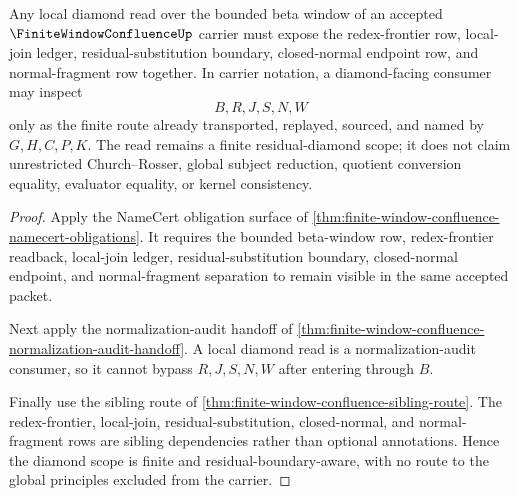 \begin{theorem}
\label{thm:finite-window-confluence-residual-diamond-scope}
Any local diamond read over the bounded beta window of an accepted $\FiniteWindowConfluenceUp$ carrier must expose the redex-frontier row, local-join ledger, residual-substitution boundary, closed-normal endpoint row, and normal-fragment row together. In carrier notation, a diamond-facing consumer may inspect
$$
B,R,J,S,N,W
$$
only as the finite route already transported, replayed, sourced, and named by $G,H,C,P,K$. The read remains a finite residual-diamond scope; it does not claim unrestricted Church--Rosser, global subject reduction, quotient conversion equality, evaluator equality, or kernel consistency.
\end{theorem}
\begin{proof}
Apply the NameCert obligation surface of \autoref{thm:finite-window-confluence-namecert-obligations}. It requires the bounded beta-window row, redex-frontier readback, local-join ledger, residual-substitution boundary, closed-normal endpoint, and normal-fragment separation to remain visible in the same accepted packet.

Next apply the normalization-audit handoff of \autoref{thm:finite-window-confluence-normalization-audit-handoff}. A local diamond read is a normalization-audit consumer, so it cannot bypass $R,J,S,N,W$ after entering through $B$.

Finally use the sibling route of \autoref{thm:finite-window-confluence-sibling-route}. The redex-frontier, local-join, residual-substitution, closed-normal, and normal-fragment rows are sibling dependencies rather than optional annotations. Hence the diamond scope is finite and residual-boundary-aware, with no route to the global principles excluded from the carrier.
\end{proof}

